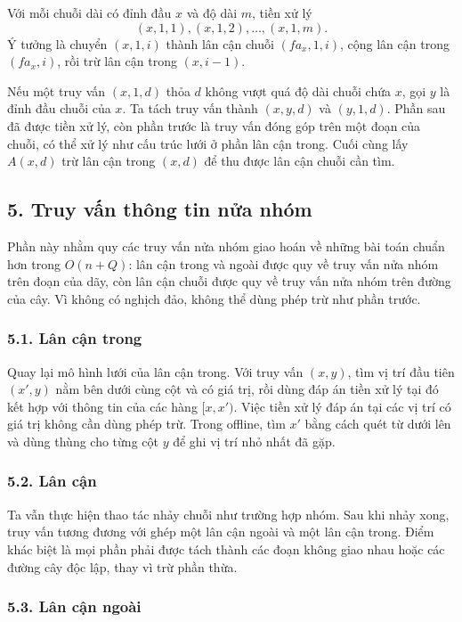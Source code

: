 \documentclass[11pt]{article}
\begin{document}
Với mỗi chuỗi dài có đỉnh đầu \(x\) và độ dài \(m\), tiền xử lý
\[
  (x,1,1),(x,1,2),\ldots,(x,1,m).
\]
Ý tưởng là chuyển \((x,1,i)\) thành lân cận chuỗi \((fa_x,1,i)\), cộng lân cận
trong \((fa_x,i)\), rồi trừ lân cận trong \((x,i-1)\).

Nếu một truy vấn \((x,1,d)\) thỏa \(d\) không vượt quá độ dài chuỗi chứa \(x\),
gọi \(y\) là đỉnh đầu chuỗi của \(x\). Ta tách truy vấn thành
\((x,y,d)\) và \((y,1,d)\). Phần sau đã được tiền xử lý, còn phần trước là truy
vấn đóng góp trên một đoạn của chuỗi, có thể xử lý như cấu trúc lưới ở phần
lân cận trong. Cuối cùng lấy \(A(x,d)\) trừ lân cận trong \((x,d)\) để thu
được lân cận chuỗi cần tìm.

\subsection*{5. Truy vấn thông tin nửa nhóm}

Phần này nhằm quy các truy vấn nửa nhóm giao hoán về những bài toán chuẩn hơn
trong \(O(n+Q)\): lân cận trong và ngoài được quy về truy vấn nửa nhóm trên
đoạn của dãy, còn lân cận chuỗi được quy về truy vấn nửa nhóm trên đường của
cây. Vì không có nghịch đảo, không thể dùng phép trừ như phần trước.

\subsubsection*{5.1. Lân cận trong}

Quay lại mô hình lưới của lân cận trong. Với truy vấn \((x,y)\), tìm vị trí
đầu tiên \((x',y)\) nằm bên dưới cùng cột và có giá trị, rồi dùng đáp án tiền
xử lý tại đó kết hợp với thông tin của các hàng \([x,x')\). Việc tiền xử lý
đáp án tại các vị trí có giá trị không cần dùng phép trừ. Trong offline, tìm
\(x'\) bằng cách quét từ dưới lên và dùng thùng cho từng cột \(y\) để ghi vị
trí nhỏ nhất đã gặp.

\subsubsection*{5.2. Lân cận}

Ta vẫn thực hiện thao tác nhảy chuỗi như trường hợp nhóm. Sau khi nhảy xong,
truy vấn tương đương với ghép một lân cận ngoài và một lân cận trong. Điểm
khác biệt là mọi phần phải được tách thành các đoạn không giao nhau hoặc các
đường cây độc lập, thay vì trừ phần thừa.

\subsubsection*{5.3. Lân cận ngoài}
\end{document}
